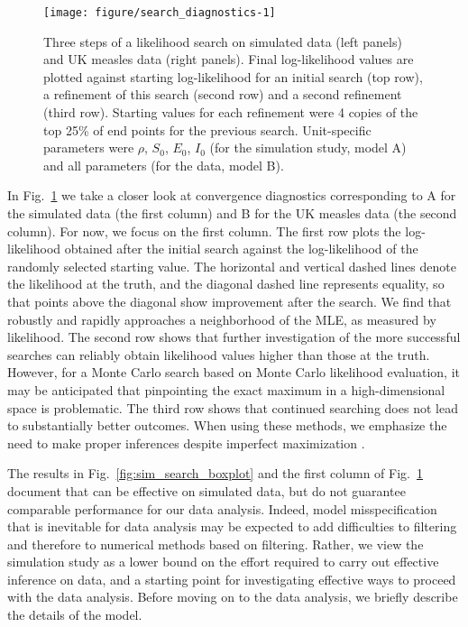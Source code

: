 \documentclass[12pt]{article}\usepackage[]{graphicx}\usepackage[]{xcolor}
\newenvironment{knitrout}{}{} %
\begin{document}
\begin{knitrout}
\color{fgcolor}\begin{figure}

\texttt{[image: figure/search\_diagnostics-1]} \hfill{}

\caption[Three steps of a likelihood search on simulated data (left panels) and UK measles data (right panels)]{Three steps of a likelihood search on simulated data (left panels) and UK measles data (right panels). Final log-likelihood values are plotted against starting log-likelihood for an initial search (top row), a refinement of this search (second row) and a second refinement (third row). Starting values for each refinement were 4 copies of the top 25\% of end points for the previous search. Unit-specific parameters were $\rho$, $S_0$, $E_0$, $I_0$ (for the simulation study, model A) and all parameters (for the data, model B).}\label{fig:search_diagnostics}
\end{figure}

\end{knitrout}


In Fig.~\ref{fig:search_diagnostics} we take a closer look at convergence diagnostics corresponding to A for the simulated data (the first column) and B for the UK measles data (the second column).
For now, we focus on the first column.
The first row plots the log-likelihood obtained after the initial search against the log-likelihood of the randomly selected starting value.
The horizontal and vertical dashed lines denote the likelihood at the truth, and the diagonal dashed line represents equality, so that points above the diagonal show improvement after the search.
We find that {\ibpf} robustly and rapidly approaches a neighborhood of the MLE, as measured by likelihood.
The second row shows that further investigation of the more successful searches can reliably obtain likelihood values higher than those at the truth.
However, for a Monte Carlo search based on Monte Carlo likelihood evaluation, it may be anticipated that pinpointing the exact maximum in a high-dimensional space is problematic.
The third row shows that continued searching does not lead to substantially better outcomes.
When using these methods, we emphasize the need to make proper inferences despite imperfect maximization \citep{ionides17,ning21}.


The results in Fig.~\ref{fig:sim_search_boxplot} and the first column of  Fig.~\ref{fig:search_diagnostics} document that {\ibpf} can be effective on simulated data, but do not guarantee comparable performance for our data analysis.
Indeed, model misspecification that is inevitable for data analysis may be expected to add difficulties to filtering and therefore to numerical methods based on filtering.
Rather, we view the simulation study as a lower bound on the effort required to carry out effective inference on data, and a starting point for investigating effective ways to proceed with the data analysis. Before moving on to the data analysis, we briefly describe the details of the model.
\end{document}
